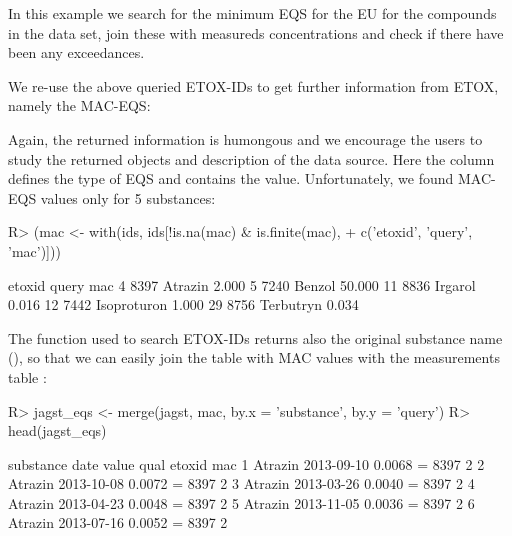 \documentclass[article, shortnames]{jss}\usepackage[]{graphicx}\usepackage[]{color}
\begin{document}
In this example we search for the minimum EQS for the EU for the compounds in the  data set, join these with measureds concentrations and check if there have been any exceedances.

We re-use the above queried ETOX-IDs to get further information from ETOX, namely the MAC-EQS:
\begin{CodeChunk}
\end{CodeChunk}

Again, the returned information is humongous and we encourage the users to study the returned objects and description of the data source.
Here the column  defines the type of EQS and  contains the value.
Unfortunately, we found MAC-EQS values only for 5 substances:

\begin{CodeChunk}
\begin{CodeInput}
R> (mac <- with(ids, ids[!is.na(mac) & is.finite(mac), 
+                        c('etoxid', 'query', 'mac')]))
\end{CodeInput}
\begin{CodeOutput}
   etoxid       query    mac
4    8397     Atrazin  2.000
5    7240      Benzol 50.000
11   8836     Irgarol  0.016
12   7442 Isoproturon  1.000
29   8756   Terbutryn  0.034
\end{CodeOutput}
\end{CodeChunk}

The  function used to search ETOX-IDs returns also the original substance name (),
so that we can easily join the table with MAC values with the measurements table :
\begin{CodeChunk}
\begin{CodeInput}
R> jagst_eqs <- merge(jagst, mac, by.x = 'substance', by.y = 'query')
R> head(jagst_eqs)
\end{CodeInput}
\begin{CodeOutput}
  substance       date  value qual etoxid mac
1   Atrazin 2013-09-10 0.0068    =   8397   2
2   Atrazin 2013-10-08 0.0072    =   8397   2
3   Atrazin 2013-03-26 0.0040    =   8397   2
4   Atrazin 2013-04-23 0.0048    =   8397   2
5   Atrazin 2013-11-05 0.0036    =   8397   2
6   Atrazin 2013-07-16 0.0052    =   8397   2
\end{CodeOutput}
\end{CodeChunk}
\end{document}

